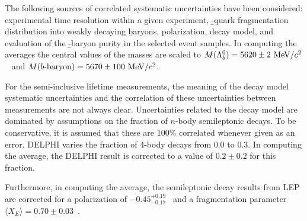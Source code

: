 The following sources of correlated systematic uncertainties have 
been considered:
experimental time resolution within a given experiment, \b-quark
fragmentation distribution into weakly decaying \b baryons,
\Lb polarization, decay model,
and evaluation of the \b-baryon purity in the selected event samples.
In computing the averages
the central values of the masses are scaled to 
$M(\Lambda_b^0) = 5620 \pm 2~\rm MeV/\mbox{$c$}^2$~\cite{Acosta:2005mq} and
$M(\mbox{\b-baryon}) = 5670 \pm 100\MeVcc$.

For the semi-inclusive lifetime measurements, 
the meaning of the decay model
systematic uncertainties
and the correlation of these uncertainties between measurements
are not always clear.
Uncertainties related to the decay model are dominated by
assumptions on the fraction of $n$-body semileptonic decays.
To be conservative, it is assumed
that these are 100\%  correlated whenever given as an error.
DELPHI varies the fraction of 4-body decays from 0.0 to 0.3. 
In computing the average, the DELPHI
result is corrected to a value of  $0.2 \pm 0.2$ for this fraction.

Furthermore, in computing the average,
the semileptonic decay results from LEP are corrected for a polarization of 
$-0.45^{+0.19}_{-0.17}$~\cite{Abbaneo:2000ej_mod,*Abbaneo:2001bv_mod_cont} and  a 
\Lb fragmentation parameter
$\langle X_E \rangle =0.70\pm 0.03$~\cite{Buskulic:1995mf}.




